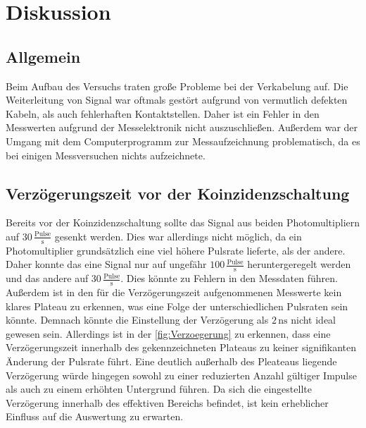 \section{Diskussion}
\label{sec:Diskussion}
\subsection{Allgemein}
Beim Aufbau des Versuchs traten große Probleme bei der Verkabelung auf. Die Weiterleitung von Signal war oftmals gestört aufgrund von vermutlich defekten Kabeln, als auch fehlerhaften Kontaktstellen. 
Daher ist ein Fehler in den Messwerten aufgrund der Messelektronik nicht auszuschließen. Außerdem war 
der Umgang mit dem Computerprogramm zur Messaufzeichnung problematisch, da es bei einigen Messversuchen nichts aufzeichnete. 

\subsection{Verzögerungszeit vor der Koinzidenzschaltung}
Bereits vor der Koinzidenzschaltung sollte das Signal aus beiden Photomultipliern auf $30 \,\frac{\text{Pulse}}{\unit{\second}}$ gesenkt 
werden. Dies war allerdings nicht möglich, da ein Photomultiplier grundsätzlich eine viel höhere Pulsrate lieferte, als der andere. 
Daher konnte das eine Signal nur auf ungefähr $100 \,\frac{\text{Pulse}}{\unit{\second}}$ heruntergeregelt werden und das andere 
auf $30 \,\frac{\text{Pulse}}{\unit{\second}}$. 
Dies könnte zu Fehlern in den Messdaten führen. 
Außerdem ist in den für die
Verzögerungszeit aufgenommenen Messwerte kein klares Plateau zu erkennen, was eine Folge der unterschiedlichen Pulsraten sein könnte. 
Demnach könnte die Einstellung der Verzögerung als $2 \, \unit{\nano\second}$ nicht ideal gewesen sein. Allerdings ist in 
der \autoref{fig:Verzoegerung} zu erkennen, dass eine Verzögerungszeit innerhalb des gekennzeichneten Plateaus zu keiner signifikanten
Änderung der Pulsrate führt.
Eine deutlich außerhalb des Pleateaus liegende Verzögerung würde hingegen sowohl zu einer reduzierten Anzahl gültiger Impulse als auch zu einem erhöhten Untergrund führen. 
Da sich die eingestellte Verzögerung innerhalb des effektiven Bereichs befindet, ist kein erheblicher Einfluss auf die Auswertung zu erwarten.

